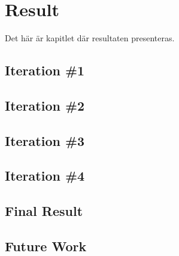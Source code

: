 \chapter{Result}\label{cha:Research}
%


Det här är kapitlet där resultaten presenteras.

%

\section{Iteration \#1}

\section{Iteration \#2}

\section{Iteration \#3}

\section{Iteration \#4}

\section{Final Result}

\section{Future Work}


%

